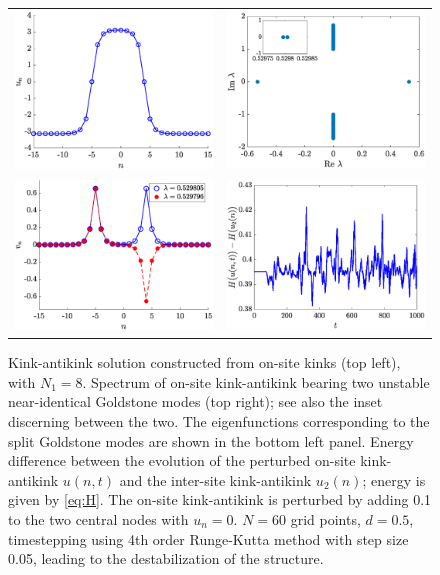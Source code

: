 \documentclass[12pt,reqno]{amsart}
\begin{document}
\begin{figure}
	\begin{center}
	\begin{tabular}{cc}
	\includegraphics[width=6cm]{unstablekak.eps} &
	\includegraphics[width=6cm]{unstablekakspec.eps} \\
	\includegraphics[width=6cm]{unstablekakgoldstone.eps} &
	\includegraphics[width=6cm]{kakenergydiff.eps}
	\end{tabular}
	\end{center}
	\caption{Kink-antikink solution constructed from on-site kinks (top left), with $N_1 = 8$. Spectrum of on-site kink-antikink bearing two unstable near-identical Goldstone modes (top right);
	see also the inset discerning between the two. The eigenfunctions corresponding to the split Goldstone modes are shown in the bottom left panel. Energy difference between the evolution of the perturbed on-site kink-antikink $u(n,t)$ and the inter-site kink-antikink $u_2(n)$; energy is given by \cref{eq:H}.
	The on-site kink-antikink is perturbed by adding 0.1 to the two central nodes with $u_n = 0$. $N=60$ grid points, $d = 0.5$, timestepping using 4th order Runge-Kutta method with step size 0.05, leading to the destabilization of the structure.} 
	\label{fig:unstablekak}
\end{figure}
\end{document}
